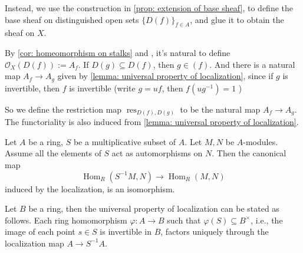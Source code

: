 \documentclass[11pt]{article}
\newcommand{\Hom}{\operatorname{Hom}}
\begin{document}
Instead, we use the construction in \autoref{prop: extension of base sheaf}, 
to define the base sheaf on distinguished open sets $ \{D(f)\}_{f \in A} $, 
and glue it to obtain the sheaf on $ X $. 

By \autoref{cor: homeomorphism on stalks} and \cite[Theorem I.3.2]{hartsAG}, 
it's natural to define $ \mathscr{O}_{X}(D(f)):= A_{f} $. 
If $ D(g) \subseteq D(f) $, then $ g \in (f) $. 
And there is a natural map $ A_{f} \to A_{g} $ given by \autoref{lemma: universal property of localization}, 
since if $ g $ is invertible, then $ f $ is invertible 
(write $ g = uf $, then $ f(ug^{-1})=1 $ )

\begin{center}
\end{center}

So we define the restriction map $ \operatorname{res}_{D(f),D(g)} $ 
to be the natural map $ A_{f} \to A_{g} $. The functoriality is also 
induced from \autoref{lemma: universal property of localization}. 

\begin{lemma}
    \label{lemma: universal property of localization}
    \cite[\href{https://stacks.math.columbia.edu/tag/07K0}{Lemma 07K0}]{stacks}
    Let $ A $ be a ring, $ S $ be a multiplicative subset of $ A $. 
    Let $ M,N $ be $ A $-modules. Assume all the elements of $ S $ 
    act as automorphisms on $ N $. Then the canonical map 
    $$ \Hom_{R}(S^{-1}M,N) \to \Hom_{R}(M,N) $$
    induced by the localization, is an isomorphism. 
\end{lemma}

Let $ B $ be a ring, then the universal property of localization 
can be stated as follows. Each ring homomorphism $ \varphi:A \to B $ 
such that $ \varphi(S) \subseteq B^{\times} $, i.e., 
the image of each point $ s \in S $ is invertible in $ B $, 
factors uniquely through the localization map $ A \to S^{-1}A $. 
\begin{center}
\end{center}
\end{document}
